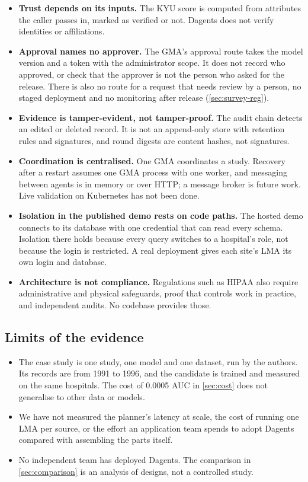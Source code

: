 \begin{itemize}
  \item \textbf{Trust depends on its inputs.} The KYU score is computed from
        attributes the caller passes in, marked as verified or not. Dagents does
        not verify identities or affiliations.
  \item \textbf{Approval names no approver.} The GMA's approval route takes the
        model version and a token with the administrator scope. It does not
        record who approved, or check that the approver is not the person who
        asked for the release. There is also no route for a request that needs
        review by a person, no staged deployment and no monitoring after
        release (\cref{sec:survey-reg}).
  \item \textbf{Evidence is tamper-evident, not tamper-proof.} The audit chain
        detects an edited or deleted record. It is not an append-only store with
        retention rules and signatures, and round digests are content hashes,
        not signatures.
  \item \textbf{Coordination is centralised.} One GMA coordinates a study.
        Recovery after a restart assumes one GMA process with one worker, and
        messaging between agents is in memory or over HTTP; a message broker is
        future work. Live validation on Kubernetes has not been done.
  \item \textbf{Isolation in the published demo rests on code paths.} The
        hosted demo connects to its database with one credential that can read
        every schema. Isolation there holds because every query switches to a
        hospital's role, not because the login is restricted. A real deployment
        gives each site's LMA its own login and database.
  \item \textbf{Architecture is not compliance.} Regulations such as HIPAA also
        require administrative and physical safeguards, proof that controls
        work in practice, and independent audits. No codebase provides those.
\end{itemize}

\subsection{Limits of the evidence}

\begin{itemize}
  \item The case study is one study, one model and one dataset, run by the
        authors. Its records are from 1991 to 1996, and the candidate is
        trained and measured on the same hospitals. The cost of 0.0005 AUC in
        \cref{sec:cost} does not generalise to other data or models.
  \item We have not measured the planner's latency at scale, the cost of
        running one LMA per source, or the effort an application team spends
        to adopt Dagents compared with assembling the parts itself.
  \item No independent team has deployed Dagents. The comparison in
        \cref{sec:comparison} is an analysis of designs, not a controlled
        study.
\end{itemize}

